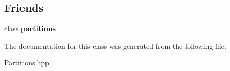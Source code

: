 \subsection*{Friends}
\begin{DoxyCompactItemize}
\item 
\hypertarget{classdscr_1_1partitions_1_1iterator_a7dff1a2bd5787e50cf3e7f227e95e62b}{class {\bfseries partitions}}\label{classdscr_1_1partitions_1_1iterator_a7dff1a2bd5787e50cf3e7f227e95e62b}

\end{DoxyCompactItemize}


The documentation for this class was generated from the following file\-:\begin{DoxyCompactItemize}
\item 
Partitions.\-hpp\end{DoxyCompactItemize}
